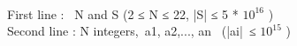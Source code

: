 \\First line :  N and S (2 ≤ N ≤ 22, |S| ≤ 5 * $10^{16}$ )
\\Second line : N integers, a1, a2,..., an  (|ai| ≤ $10^{15}$ )

 
